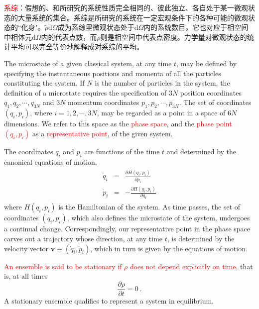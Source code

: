 \documentclass[12pt,a4paper]{article}
\renewcommand{\vec}[1]{\boldsymbol{#1}}
\newcommand{\dif}{\mathrm{d}}
\begin{document}
\textcolor{red}{系综}：假想的、和所研究的系统性质完全相同的、彼此独立、各自处于某一微观状态的大量系统的集合。系综是所研究的系统在一定宏观条件下的各种可能的微观状态的``化身"。$\tilde{\rho}\dif \Omega$成为系综里微观状态处于$\dif \Omega$内的系统数目，它也对应于相空间中相体元$\dif \Omega$内的代表点数，而$\tilde{\rho}$则是相空间中代表点密度。力学量对微观状态的统计平均可以完全等价地解释成对系综的平均。

\cite{pathria1996statistical} The microstate of a given classical system, at any time $t$, may be defined by specifying the instantaneous positions and momenta of all the particles constituting the system. If $N$ is the number of particles in the system, the definition of a microstate requires the specification of $3N$ position coordinates $q_1, q_2, \cdots, q_{3N}$ and $3N$ momentum coordinates $p_1, p_2, \cdots, p_{3N}$. The set of coordinates $(q_i, p_i)$, where $i = 1, 2, \cdots,3N$, may be regarded as a point in a space of $6N$ dimensions. We refer to this space as the \textcolor{red}{phase space}, and the \textcolor{red}{phase point $(q_i, p_i)$} as a \textcolor{red}{representative point}, of the given system.

The coordinates $q_i$ and $p_i$ are functions of the time $t$ and determined by the canonical equations of motion,
\begin{eqnarray}
\begin{split}
\dot{q}_i &=& \frac{\partial H(q_i, p_i)}{\partial p_i}  \\
\dot{p}_i &=& -\frac{\partial H(q_i, p_i)}{\partial q_i} 
\end{split}
\end{eqnarray}
where $H(q_i, p_i)$ is the Hamiltonian of the system. As time passes, the set of coordinates $(q_i, p_i)$, which also defines the microstate of the system, undergoes a continual change. Correspondingly, our representative point in the phase space carves out a trajectory whose direction, at any time $t$, is determined by the velocity vector $\vec{v} \equiv (\dot{q}_i, \dot{p}_i)$, which in turn is given by the equations of motion. 



\textcolor{red}{An ensemble is said to be stationary if $\rho$ does not depend explicitly on time}, that is, at all times
\begin{equation}
\frac{\partial \rho}{\partial t} = 0 ~.
\end{equation}
A stationary ensemble qualifies to represent a system in equilibrium.
\end{document}

